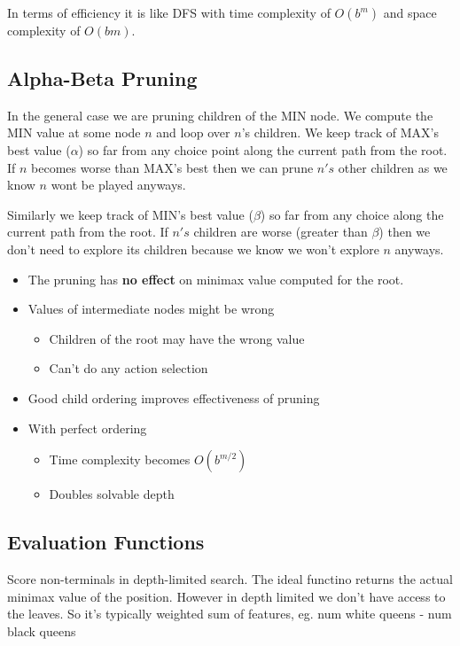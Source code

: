 In terms of efficiency it is like DFS with time complexity of $O(b^{m})$ and space complexity of $O(bm)$.

\subsection{Alpha-Beta Pruning}
In the general case we are pruning children of the MIN node. We compute the MIN value at some node $n$ and loop over $n$'s children. We keep track of MAX's best value ($\alpha$) so far from any choice  point along the current path from the root. If $n$ becomes worse than MAX's best then we can prune  $n's$ other children as we know  $n$ wont be played anyways.

\vspace{1em}

Similarly we keep track of MIN's best value ($\beta$) so far from any choice along the current path from the root. If $n's$ children are worse (greater than $\beta$) then we don't need to explore its children because we know we won't explore $n$ anyways.

\vspace{1em}

\begin{itemize}
    \item The pruning has \textbf{no effect} on minimax value computed for the root. 
    \item Values of intermediate nodes might be wrong
        \begin{itemize}
            \item Children of the root may have the wrong value
            \item Can't do any action selection
        \end{itemize}
    \item Good child ordering improves effectiveness of pruning
    \item With perfect ordering
        \begin{itemize}
            \item Time complexity becomes $O(b^{m /2})$
            \item Doubles solvable depth
        \end{itemize}
\end{itemize}


\subsection{Evaluation Functions}
Score non-terminals in depth-limited search. The ideal functino returns the actual minimax value of the position. However in depth limited we don't have access to the leaves. So it's  typically weighted sum of features, eg. num white queens - num black queens



